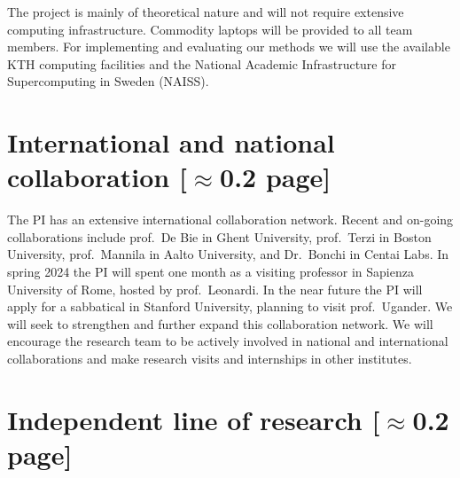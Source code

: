 \documentclass[a4paper,11pt]{article}
\begin{document}

The project is mainly of theoretical nature and will not require extensive computing infrastructure. 
Commodity laptops will be provided to all team members. 
For implementing and evaluating our methods we will use the available 
KTH computing facilities
and the National Academic Infrastructure for Supercomputing in Sweden (NAISS).

\section{International and national collaboration {\color{orange}[$\approx$0.2 page]}}


The PI has an extensive international collaboration network. 
Recent and on-going collaborations include
prof.\ De Bie in Ghent University, 
prof.\ Terzi in Boston University,
prof.\ Mannila in Aalto University, and 
Dr.\ Bonchi in Centai Labs.
In spring 2024 the PI will spent one month as a visiting professor 
in Sapienza University of Rome, hosted by prof.\ Leonardi.
In the near future the PI will apply for a sabbatical in Stanford University, 
planning to visit prof.\ Ugander. 
We will seek to strengthen and further expand this collaboration network.
We will encourage the research team to be actively involved in national and international collaborations
and make research visits and internships in other institutes.

\section{Independent line of research {\color{orange}[$\approx$0.2 page]}}



\iffalse
{\small
\setlength{\bibsep}{0pt}


}
\fi

% 
\end{document}
